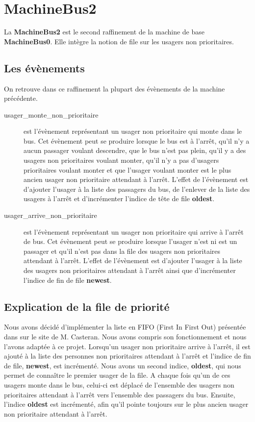 \documentclass[a4paper,titlepage]{report}
\begin{document}
\newpage
\section{MachineBus2}	
	La \textbf{MachineBus2} est le second raffinement de la machine de base \textbf{MachineBus0}. Elle intègre la notion de file sur les usagers non prioritaires.\\

	\subsection{Les évènements}
		On retrouve dans ce raffinement la plupart des évènements de la machine précédente.\\
		
		\begin{description}
			\item[usager\_monte\_non\_prioritaire] est l'évènement représentant un usager non prioritaire qui monte dans le bus.
			Cet évènement peut se produire lorsque le bus est à l'arrêt, qu'il n'y a aucun passager voulant descendre, que le bus n'est pas plein, qu'il y a des usagers non prioritaires voulant monter, qu'il n'y a pas d'usagers prioritaires voulant monter et que l'usager voulant monter est le plus ancien usager non prioritaire attendant à l'arrêt.
			L'effet de l'évènement est d'ajouter l'usager à la liste des passagers du bus, de l'enlever de la liste des usagers à l'arrêt et d'incrémenter l'indice de tête de file \textbf{oldest}.
			
			\item[usager\_arrive\_non\_prioritaire] est l'évènement représentant un usager non prioritaire qui arrive à l'arrêt de bus.
			Cet évènement peut se produire lorsque l'usager n'est ni est un passager et qu'il n'est pas dans la file des usagers non prioritaires attendant à l'arrêt.
			L'effet de l'évènement est d'ajouter l'usager à la liste des usagers non prioritaires attendant à l'arrêt ainsi que d'incrémenter l'indice de fin de file \textbf{newest}.

		\end{description}
		
	\subsection{Explication de la file de priorité}
		Nous avons décidé d'implémenter la liste en FIFO (First In First Out) présentée dans sur le site de M. Casteran. Nous avons compris son fonctionnement et nous l'avons adaptée à ce projet. Lorsqu'un usager non prioritaire arrive à l'arrêt, il est ajouté à la liste des personnes non prioritaires attendant à l'arrêt et l'indice de fin de file, \textbf{newest}, est incrémenté. Nous avons un second indice, \textbf{oldest}, qui nous permet de connaître le premier usager de la file. A chaque fois qu'un de ces usagers monte dans le bus, celui-ci est déplacé de l'ensemble des usagers non prioritaires attendant à l'arrêt vers l'ensemble des passagers du bus. Ensuite, l'indice \textbf{oldest} est incrémenté, afin qu'il pointe toujours sur le plus ancien usager non prioritaire attendant à l'arrêt.
\end{document}
